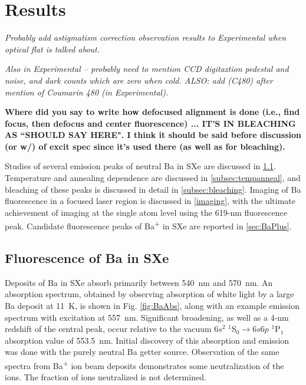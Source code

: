 \chapter{Results}

\emph{\color{gray}Probably add astigmatism correction observation results to Experimental when optical flat is talked about.}

\emph{\color{gray}Also in Experimental -- probably need to mention CCD digitaztion pedestal and noise, and dark counts which are zero when cold.  ALSO:  add (C480) after mention of Coumarin 480 (in Experimental).}

\textbf{\color{red}Where did you say to write how defocused alignment is done (i.e., find focus, then defocus and center fluorescence) ... IT'S IN BLEACHING AS ``SHOULD SAY HERE".  I think it should be said before discussion (or w/) of excit spec since it's used there (as well as for bleaching).}

Studies of several emission peaks of neutral Ba in SXe are discussed in \ref{sec:fluorescence}.  Temperature and annealing dependence are discussed in \ref{subsec:tempanneal}, and bleaching of these peaks is discussed in detail in \ref{subsec:bleaching}.  Imaging of Ba fluorescence in a focused laser region is discussed in \ref{imaging}, with the ultimate achievement of imaging at the single atom level using the 619-nm fluorescence peak.  Candidate fluorescence peaks of Ba\textsuperscript{+} in SXe are reported in \ref{sec:BaPlus}.

\section{Fluorescence of Ba in SXe}
\label{sec:fluorescence}

Deposits of Ba in SXe absorb primarily between 540~nm and 570~nm.  An absorption spectrum, obtained by observing absorption of white light by a large Ba deposit at 11~K, is shown in Fig. \ref{fig:BaAbs}, along with an example emission spectrum with excitation at 557~nm.  Significant broadening, as well as a 4-nm redshift  of the central peak, occur relative to the vacuum $6s^{2}$ $^{1}$S$_{0} \rightarrow 6s6p$ $^{1}$P$_{1}$ absorption value of 553.5~nm.  Initial discovery of this absorption and emission was done with the purely neutral Ba getter source.  Observation of the same spectra from Ba\textsuperscript{+} ion beam deposits demonstrates some neutralization of the ions.  The fraction of ions neutralized is not determined.  \cite{Mong2015,Shon,Brian}

